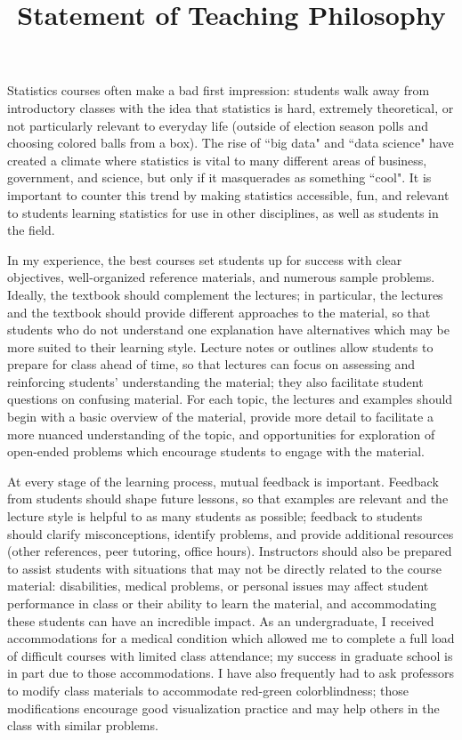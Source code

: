 \documentclass[10pt,letterpaper,sans,unicode]{moderncv}        %
\title{Statement of Teaching Philosophy}                               %
\begin{document}
\makecvtitle
\setlength{\parindent}{15pt} %

Statistics courses often make a bad first impression: students walk away from introductory classes with the idea that statistics is hard, extremely theoretical, or not particularly relevant to everyday life (outside of election season polls and choosing colored balls from a box). The rise of ``big data" and ``data science" have created a climate where statistics is vital to many different areas of business, government, and science, but only if it masquerades as something ``cool". It is important to counter this trend by making statistics accessible, fun, and relevant to students learning statistics for use in other disciplines, as well as students in the field. 

\vspace{1cm}\hspace{12pt}
In my experience, the best courses set students up for success with clear objectives, well-organized reference materials, and numerous sample problems. Ideally, the textbook should complement the lectures; in particular, the lectures and the textbook should provide different approaches to the material, so that students who do not understand one explanation have alternatives which may be more suited to their learning style. Lecture notes or outlines allow students to prepare for class ahead of time, so that lectures can focus on assessing and reinforcing students' understanding the material; they also facilitate student questions on confusing material. For each topic, the lectures and examples should begin with a basic overview of the material, provide more detail to facilitate a more nuanced understanding of the topic, and opportunities for exploration of open-ended problems which encourage students to engage with the material.  

\vspace{1cm}\hspace{12pt}
At every stage of the learning process, mutual feedback is important. Feedback from students should shape future lessons, so that examples are relevant and the lecture style is helpful to as many students as possible; feedback to students should clarify misconceptions, identify problems, and provide additional resources (other references, peer tutoring, office hours). 
Instructors should also be prepared to assist students with situations that may not be directly related to the course material: disabilities, medical problems, or personal issues may affect student performance in class or their ability to learn the material, and accommodating these students can have an incredible impact. As an undergraduate, I received accommodations for a medical condition which allowed me to complete a full load of difficult courses with limited class attendance; my success in graduate school is in part due to those accommodations. I have also frequently had to ask professors to modify class materials to accommodate red-green colorblindness; those modifications encourage good visualization practice and may help others in the class with similar problems. 
\end{document}
